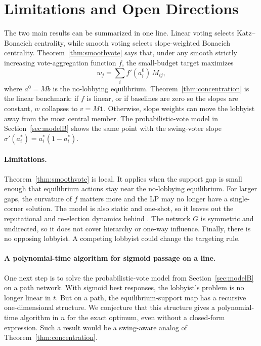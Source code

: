 \documentclass[11pt,letterpaper]{article}
\theoremstyle{plain}
\theoremstyle{definition}
\theoremstyle{remark}
\begin{document}

\section{Limitations and Open Directions}
\label{sec:discussion}

The two main results can be summarized in one line. Linear voting selects Katz--Bonacich centrality, while smooth voting selects slope-weighted Bonacich centrality. Theorem~\ref{thm:smoothvote} says that, under any smooth strictly increasing vote-aggregation function $f$, the small-budget target maximizes
\[
w_j = \sum_i f'(a_i^0)\, M_{ij},
\]
where $a^0 = Mb$ is the no-lobbying equilibrium. Theorem~\ref{thm:concentration} is the linear benchmark: if $f$ is linear, or if baselines are zero so the slopes are constant, $w$ collapses to $v = M\mathbf{1}$. Otherwise, slope weights can move the lobbyist away from the most central member. The probabilistic-vote model in Section~\ref{sec:modelB} shows the same point with the swing-voter slope $\sigma'(a_i^*) = a_i^*(1 - a_i^*)$.

\paragraph{Limitations.} Theorem~\ref{thm:smoothvote} is local. It applies when the support gap is small enough that equilibrium actions stay near the no-lobbying equilibrium. For larger gaps, the curvature of $f$ matters more and the LP may no longer have a single-corner solution. The model is also static and one-shot, so it leaves out the reputational and re-election dynamics behind \citet{shleifer1993}. The network $G$ is symmetric and undirected, so it does not cover hierarchy or one-way influence. Finally, there is no opposing lobbyist. A competing lobbyist could change the targeting rule.

\paragraph{A polynomial-time algorithm for sigmoid passage on a line.} One next step is to solve the probabilistic-vote model from Section~\ref{sec:modelB} on a path network. With sigmoid best responses, the lobbyist's problem is no longer linear in $t$. But on a path, the equilibrium-support map has a recursive one-dimensional structure. We conjecture that this structure gives a polynomial-time algorithm in $n$ for the exact optimum, even without a closed-form expression. Such a result would be a swing-aware analog of Theorem~\ref{thm:concentration}.
\end{document}
